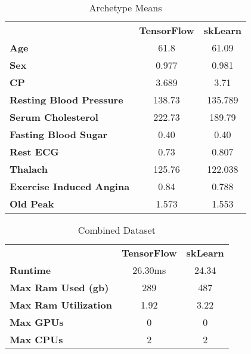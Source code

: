 \documentclass[conference]{IEEEtran}
\begin{document}
\FloatBarrier
\begin{table}[!htbp]
\caption{Archetype Means}
\begin{center}
\begin{tabular}{|l|c|c|}
\hline
\textbf{ }&\textbf{TensorFlow}&\textbf{skLearn} \\
\cline{1-3} 
\textbf{Age} & 61.8 & 61.09 \\
\cline{1-3} 
\textbf{Sex} & 0.977 & 0.981 \\
\cline{1-3} 
\textbf{CP} & 3.689 & 3.71 \\
\cline{1-3} 
\textbf{Resting Blood Pressure} & 138.73 & 135.789 \\
\cline{1-3} 
\textbf{Serum Cholesterol} & 222.73 & 189.79 \\
\cline{1-3} 
\textbf{Fasting Blood Sugar} & 0.40 & 0.40 \\
\cline{1-3} 
\textbf{Rest ECG} & 0.73 & 0.807 \\
\cline{1-3} 
\textbf{Thalach} & 125.76 & 122.038 \\
\cline{1-3} 
\textbf{Exercise Induced Angina} & 0.84 & 0.788 \\
\cline{1-3} 
\textbf{Old Peak} & 1.573 & 1.553 \\
\hline
\end{tabular}
\label{tab3}
\end{center}
\end{table}
\FloatBarrier

\FloatBarrier
\begin{table}[htbp]
\caption{Combined Dataset}
\begin{center}
\begin{tabular}{|l|c|c|}
\hline
\textbf{ }&\textbf{TensorFlow}&\textbf{skLearn} \\
\cline{1-3} 
\textbf{Runtime} & 26.30ms & 24.34 \\
\cline{1-3} 
\textbf{Max Ram Used (gb)} & 289 & 487 \\
\cline{1-3} 
\textbf{Max Ram Utilization} & 1.92 & 3.22 \\
\cline{1-3} 
\textbf{Max GPUs} & 0 & 0 \\
\cline{1-3} 
\textbf{Max CPUs} & 2 & 2 \\
\hline
\end{tabular}
\label{tab4}
\end{center}
\end{table}
\FloatBarrier
\end{document}
